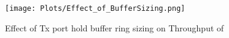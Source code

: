 \begin{figure}[t]
\begin{center}
\texttt{[image: Plots/Effect\_of\_BufferSizing.png]}
\caption{Effect of Tx port hold buffer ring sizing on Throughput of \name}
\label{fig:Effect_of_BufferSizing}
\end{center}
\end{figure}